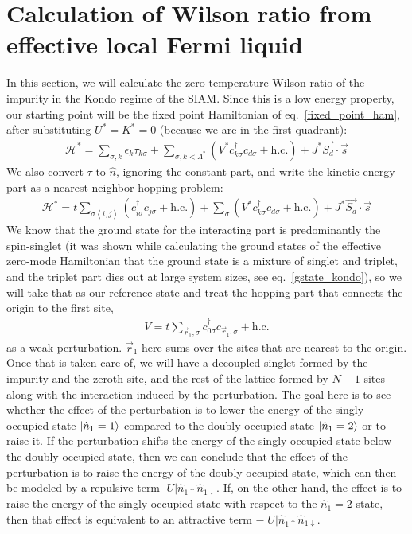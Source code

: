 \documentclass[twoside,11pt]{report}
\numberwithin{equation}{section}
\begin{document}
\section{Calculation of Wilson ratio from effective local Fermi liquid}
In this section, we will calculate the zero temperature Wilson ratio of the impurity in the Kondo regime of the SIAM. Since this is a low energy property, our starting point will be the fixed point Hamiltonian of eq.~\ref{fixed_point_ham}, after substituting \(U^*=K^*=0\) (because we are in the first quadrant):
\begin{equation}\begin{aligned}
	\mathcal{H}^* = \sum_{\sigma, k}\epsilon_k \tau_{k\sigma} + \sum_{\sigma, k < \Lambda^*}\left( V^* c^\dagger_{k\sigma}c_{d\sigma} + \text{h.c.} \right) + J^* \vec{S_d}\cdot\vec{s}
\end{aligned}\end{equation}
We also convert \(\tau\) to \(\hat n\), ignoring the constant part, and write the kinetic energy part as a nearest-neighbor hopping problem:
\begin{equation}\begin{aligned}
	\mathcal{H}^* = t\sum_{\sigma\left<i,j \right>}\left(c^\dagger_{i\sigma}c_{j\sigma} + \text{h.c.}\right) + \sum_{\sigma}\left( V^* c^\dagger_{k\sigma}c_{d\sigma} + \text{h.c.} \right) + J^* \vec{S_d}\cdot\vec{s}
\end{aligned}\end{equation}
We know that the ground state for the interacting part is predominantly the spin-singlet (it was shown while calculating the ground states of the effective zero-mode Hamiltonian that the ground state is a mixture of singlet and triplet, and the triplet part dies out at large system sizes, see eq.~\ref{gstate_kondo}), so we will take that as our reference state and treat the hopping part that connects the origin to the first site,
\begin{equation}\begin{aligned}
	V = t\sum_{\vec r_1,\sigma} c^\dagger_{0\sigma}c_{\vec r_1,\sigma} +\text{h.c.}
\end{aligned}\end{equation}
as a weak perturbation. \(\vec r_1\) here sums over the sites that are nearest to the origin. Once that is taken care of, we will have a decoupled singlet formed by the impurity and the zeroth site, and the rest of the lattice formed by \(N-1\) sites along with the interaction induced by the perturbation. The goal here is to see whether the effect of the perturbation is to lower the energy of the singly-occupied state \(\ket{\hat n_1 = 1}\) compared to the doubly-occupied state \(\ket{\hat n_1 = 2}\) or to raise it. If the perturbation shifts the energy of the singly-occupied state below the doubly-occupied state, then we can conclude that the effect of the perturbation is to raise the energy of the doubly-occupied state, which can then be modeled  by a repulsive term \(|U|\hat n_{1\uparrow}\hat n_{1\downarrow}\). If, on the other hand, the effect is to raise the energy of the singly-occupied state with respect to the \(\hat n_1 = 2\) state, then that effect is equivalent to an attractive term \(-|U|\hat n_{1\uparrow}\hat n_{1\downarrow}\).
\end{document}
